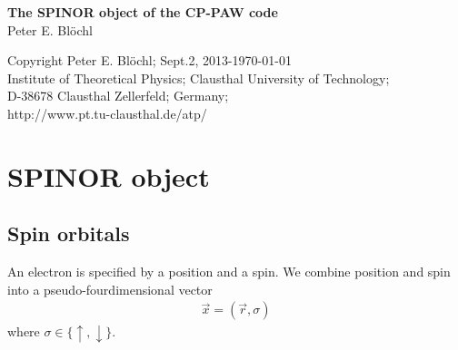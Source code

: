 \documentclass[11pt,a4paper]{report}
\begin{document}
\begin{titlepage}
\begin{center}
\vspace*{3.5cm}
{\huge \textbf{The SPINOR object of the CP-PAW code}}\\
\vspace{0.5cm}
{\large Peter E. Bl\"ochl}
\vspace{0.5cm} 
\end{center}

\vfill
\begin{center}
Copyright Peter E. Bl\"ochl; Sept.2, 2013-\today\\
{\small
Institute of Theoretical Physics;
Clausthal University of Technology;\\ 
D-38678 Clausthal Zellerfeld; Germany;\\
http://www.pt.tu-clausthal.de/atp/}
\end{center}
\end{titlepage}
\noindent            
\tableofcontents
\newpage
\chapter{SPINOR object}
\label{sec:spinorb}
\section{Spin orbitals}
\label{sec:spinorbitals}
An electron is specified by a position and a spin. We combine position
and spin into a pseudo-fourdimensional vector
\begin{eqnarray}
\vec{x}=(\vec{r},\sigma)
\label{eq:spinorbdefx}
\end{eqnarray}
where $\sigma\in\{\uparrow,\downarrow\}$.
\end{document}
